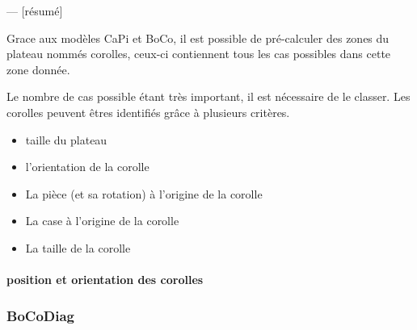 	--- [résumé]

	Grace aux modèles CaPi et BoCo, il est possible de pré-calculer des zones du plateau nommés corolles, ceux-ci contiennent tous les cas possibles dans cette zone donnée.

	Le nombre de cas possible étant très important, il est nécessaire de le classer. Les corolles peuvent êtres identifiés grâce à plusieurs critères.

	\begin{itemize}
		\item taille du plateau
		\item l'orientation de la corolle
		\item La pièce (et sa rotation) à l'origine de la corolle
		\item La case à l'origine de la corolle
		\item La taille de la corolle
	\end{itemize}

	\paragraph{position et orientation des corolles}

	\subsubsection{BoCoDiag}
